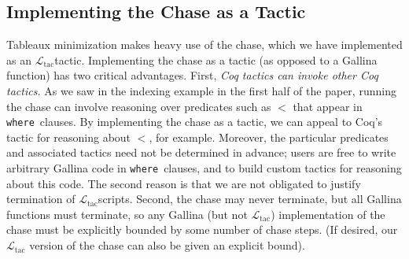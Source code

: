 \documentclass[preprint]{sigplanconf}
\newcommand{\WHERE}{{\tt where}\relax\ifmmode\ \else\xspace\fi}
\newcommand{\ltac}[0]{\ensuremath{\mathcal{L}_{\mathrm{tac}}}}
\begin{document}
\begin{comment}

The final result of normalization for the movies query is exactly the query presented in Section~\ref{sec:example}.
In our syntax:
\begin{coq}
query (Mprod Movies Movies)
      (fun x => (fst x).(title) = (snd x).(title))
      (fun x => ((fst x).(director), (snd x).(actor)))
\end{coq}
\end{comment}

\subsection{Implementing the Chase as a Tactic}
\label{sec:ltac-chase}

Tableaux minimization makes heavy use of the chase, which we have implemented as an \ltac tactic.
Implementing the chase as a tactic (as opposed to a Gallina function) has two critical advantages.
First, {\it Coq tactics can invoke other Coq tactics.}
As we saw in the indexing example in the first half of the paper, running the chase can involve reasoning over predicates such as $<$ that appear in \WHERE clauses.
By implementing the chase as a tactic, we can appeal to Coq's  tactic for reasoning about $<$, for example.
Moreover, the particular predicates and associated tactics need not be determined in advance; users are free to write arbitrary Gallina code in \WHERE clauses, and to build custom tactics for reasoning about this code.
The second reason is that we are not obligated to justify termination of \ltac scripts.
Second, the chase may never terminate, but all Gallina functions must terminate, so any Gallina (but not \ltac{}) implementation of the chase must be explicitly bounded by some number of chase steps.
(If desired, our \ltac{} version of the chase can also be given an explicit bound).
\end{document}
